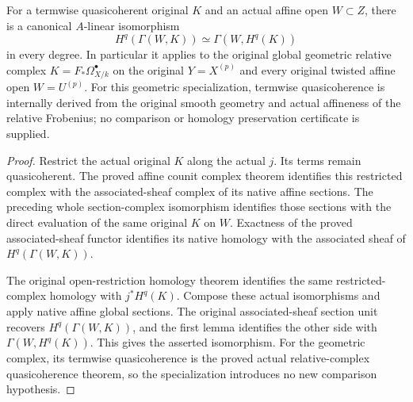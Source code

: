 \begin{theorem}
\label{thm:cartier-geometric-affine-homology-sections}
\leanok
{}
For a termwise quasicoherent original $K$ and an actual affine open
$W\subset Z$, there is a canonical $A$-linear isomorphism
\[
 H^q(\Gamma(W,K))\simeq\Gamma(W,H^q(K))
\]
in every degree. In particular it applies to the original global
geometric relative complex $K=F_*\Omega^\bullet_{X/k}$ on the
original $Y=X^{(p)}$ and every original twisted affine open $W=U^{(p)}$.
For this geometric specialization, termwise quasicoherence is
internally derived from the original smooth geometry and actual
affineness of the relative Frobenius; no comparison or homology
preservation certificate is supplied.
\end{theorem}
\begin{proof}
Restrict the actual original $K$ along the actual $j$. Its terms
remain quasicoherent. The proved affine counit complex theorem
identifies this restricted complex with the associated-sheaf complex
of its native affine sections. The preceding whole section-complex
isomorphism identifies those sections with the direct evaluation of
the same original $K$ on $W$. Exactness of the proved associated-sheaf
functor identifies its native homology with the associated sheaf of
$H^q(\Gamma(W,K))$.

The original open-restriction homology theorem identifies the same
restricted-complex homology with $j^*H^q(K)$. Compose these actual
isomorphisms and apply native affine global sections. The original
associated-sheaf section unit recovers $H^q(\Gamma(W,K))$, and the
first lemma identifies the other side with $\Gamma(W,H^q(K))$.
This gives the asserted isomorphism. For the geometric complex,
its termwise quasicoherence is the proved actual relative-complex
quasicoherence theorem, so the specialization introduces no new
comparison hypothesis.
\end{proof}

